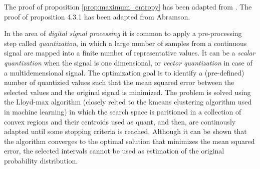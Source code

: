 The proof of proposition \ref{prop:maximum_entropy} has been adapted from \cite{abramson1963information}.
The proof of proposition 4.3.1 has been adapted from Abramson.

In the area of \emph{digital signal processing} \cite{gersho2012vector} it is common to apply a pre-processing step called \emph{quantization}, in which a large number of samples from a continuous signal are mapped into a finite number of representative values. It can be a \emph{scalar quantization} when the signal is one dimensional, or \emph{vector quantization} in case of a multidemensional signal. The optimization goal is to identify a (pre-defined) number of quantizied values such that the mean squared error between the selected values and the original signal is minimized. The problem is solved using the Lloyd-max algorithm \cite{lloyd1982least} (closely relted to the kmeans clustering algorithm \cite{} used in machine learning) in which the search space is paritioned in a collection of convex regions and their centroids used as quant, and then, are continously adapted until some stopping criteria is reached. Although it can be shown that the algorithm converges to the optimal solution that minimizes the mean squared error, the selected intervals cannot be used as estimation of the original probability distribution.





